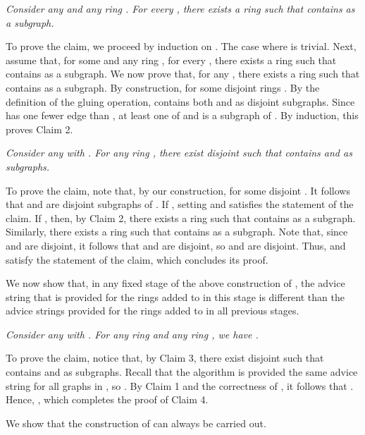\documentclass[11pt]{article}
\newcommand{\qed}{\hfill  \bigbreak}
\newenvironment{proof}{\noindent {\bf Proof.}}{\qed}
\begin{document}
\begin{proof}
\vspace{3mm} 
\textit{Consider any  and any ring . For every , there exists a ring  such that  contains  as a subgraph.}
\vspace{3mm}

To prove the claim, we proceed by induction on . The case where  is trivial. Next, assume that, for some  and any ring , for every , there exists a ring  such that  contains  as a subgraph. We now prove that, for any , there exists a ring  such that  contains  as a subgraph. By construction,  for some disjoint rings . By the definition of the gluing operation,  contains both  and  as disjoint subgraphs. Since  has one fewer edge than , at least one of   and  is a subgraph of . By induction, this proves Claim 2.

\vspace{3mm} 
\textit{Consider any  with . For any ring , there exist disjoint  such that  contains  and  as subgraphs.}
\vspace{3mm}

To prove the claim, note that, by our construction,   for some disjoint . It follows that  and  are disjoint subgraphs of . If , setting  and  satisfies the statement of the claim. If , then, by Claim 2, there exists a ring  such that  contains  as a subgraph. Similarly, there exists a ring  such that  contains  as a subgraph. Note that, since  and  are disjoint, it follows that  and  are disjoint, so  and  are disjoint. Thus,  and  satisfy the statement of the claim, which concludes its proof.

We now show that, in any fixed stage of the above construction of , the advice string that is provided for the rings added to  in this stage is different than the advice strings provided for the rings added to  in all previous stages.

\vspace{3mm} 
\textit{Consider any  with . For any ring  and any ring , we have .}
\vspace{3mm}

To prove the claim, notice that, by Claim 3, there exist disjoint  such that  contains  and  as subgraphs. Recall that the algorithm is provided the same advice string for all graphs in , so . By Claim 1 and the correctness of , it follows that . Hence, , which completes the proof of Claim 4.


We show that the construction of  can always be carried out. 


\end{proof}
\end{document}
